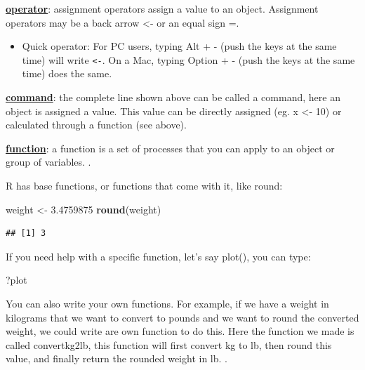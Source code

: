 \documentclass[
]{book}
\newenvironment{Shaded}{\begin{snugshade}}{\end{snugshade}}
\newcommand{\FloatTok}[1]{\textcolor[rgb]{0.00,0.00,0.81}{#1}}
\newcommand{\KeywordTok}[1]{\textcolor[rgb]{0.13,0.29,0.53}{\textbf{#1}}}
\newcommand{\NormalTok}[1]{#1}
\newcommand{\StringTok}[1]{\textcolor[rgb]{0.31,0.60,0.02}{#1}}
\providecommand{\tightlist}{%
  \setlength{\itemsep}{0pt}\setlength{\parskip}{0pt}}
\begin{document}
\href{https://stat.ethz.ch/R-manual/R-devel/library/base/html/Syntax.html}{\textbf{operator}}: assignment operators assign a value to an object. Assignment operators may be a back arrow \textless- or an equal sign =.

\begin{itemize}
\tightlist
\item
  Quick operator: For PC users, typing Alt + - (push the keys at the same time) will write \texttt{\textless{}-}. On a Mac, typing Option + - (push the keys at the same time) does the same.
\end{itemize}

\href{https://personality-project.org/r/r.commands.html}{\textbf{command}}: the complete line shown above can be called a command, here an object is assigned a value. This value can be directly assigned (eg. x \textless- 10) or calculated through a function (see above).

\href{\%22https://www.tutorialspoint.com/r/r_functions.htm\%22}{\textbf{function}}: a function is a set of processes that you can apply to an object or group of variables. .

R has base functions, or functions that come with it, like round:

\begin{Shaded}
\begin{Highlighting}[]
\NormalTok{weight \textless{}{-}}\StringTok{ }\FloatTok{3.4759875}
\KeywordTok{round}\NormalTok{(weight)}
\end{Highlighting}
\end{Shaded}

\begin{verbatim}
## [1] 3
\end{verbatim}

If you need help with a specific function, let's say plot(), you can type:

\begin{Shaded}
\begin{Highlighting}[]
\NormalTok{?plot}
\end{Highlighting}
\end{Shaded}

You can also write your own functions. For example, if we have a weight in kilograms that we want to convert to pounds and we want to round the converted weight, we could write are own function to do this. Here the function we made is called convertkg2lb, this function will first convert kg to lb, then round this value, and finally return the rounded weight in lb. .
\end{document}

